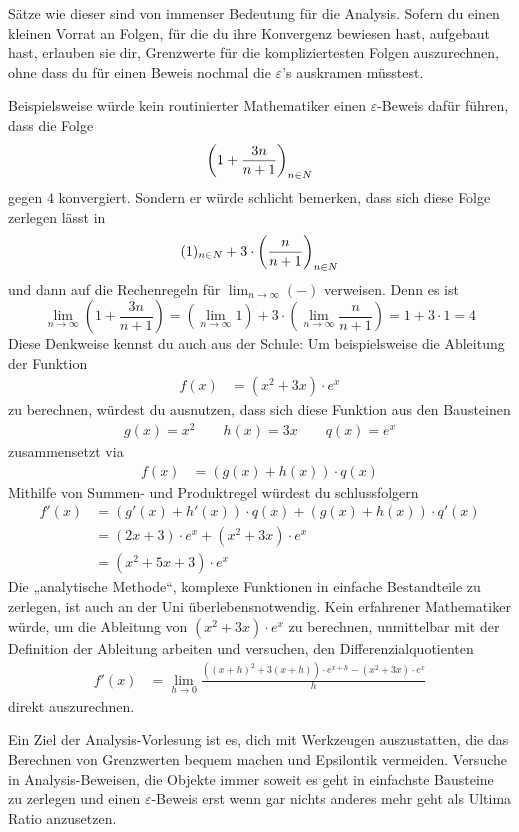 \begin{bem}
    Sätze wie dieser sind von immenser Bedeutung für die Analysis. Sofern du einen kleinen Vorrat an Folgen, für die du ihre Konvergenz bewiesen hast, aufgebaut hast, erlauben sie dir, Grenzwerte für die kompliziertesten Folgen auszurechnen, ohne dass du für einen Beweis nochmal die $\varepsilon$'s auskramen müsstest.
    
    Beispielsweise würde kein routinierter Mathematiker einen $\varepsilon$-Beweis dafür führen, dass die Folge
        \[ \left( 1 + \frac{3n}{n+1} \right)_{n\in \relax N} \]
    gegen $4$ konvergiert. Sondern er würde schlicht bemerken, dass sich diese Folge zerlegen lässt in
        \[ (1)_{n\in \relax N} + 3\cdot \left(\frac{n}{n+1}\right)_{n\in \relax N} \]
    und dann auf die Rechenregeln für $\lim_{n\to\infty}(-)$ verweisen. Denn es ist
        \[ \lim_{n\to \infty} \left( 1+ \frac{3n}{n+1} \right) = \left( \lim_{n\to \infty} 1 \right)+3\cdot \left( \lim_{n\to \infty} \frac{n}{n+1} \right) = 1+3\cdot 1 = 4 \]
    Diese Denkweise kennst du auch aus der Schule: Um beispielsweise die Ableitung der Funktion
    \begin{align*}
        f(x) &= (x^2+3x)\cdot e^x
    \end{align*}
    zu berechnen, würdest du ausnutzen, dass sich diese Funktion aus den Bausteinen
    \begin{align*}
        g(x) = x^2 \qquad h(x) = 3x \qquad q(x) = e^x
    \end{align*}
    zusammensetzt via
    \begin{align*}
        f(x) & = (g(x)+h(x))\cdot q(x)
    \end{align*}
    Mithilfe von Summen- und Produktregel würdest du schlussfolgern
    \begin{align*}
        f'(x) & = (g'(x)+h'(x))\cdot q(x)  + (g(x)+h(x))\cdot q'(x) \\
        & = (2x+3)\cdot e^x + (x^2+3x)\cdot e^x \\
        & = (x^2+5x+3)\cdot e^x
    \end{align*}
    Die „analytische Methode“, komplexe Funktionen in einfache Bestandteile zu zerlegen, ist auch an der Uni überlebensnotwendig. Kein erfahrener Mathematiker würde, um die Ableitung von $(x^2+3x)\cdot e^x$ zu berechnen, unmittelbar mit der Definition der Ableitung arbeiten und versuchen, den Differenzialquotienten
    \begin{align*}
        f'(x)&=\lim_{h\to 0} \frac{((x+h)^2+3(x+h))\cdot e^{x+h} - (x^2+3x)\cdot e^{x}}{h}
    \end{align*}
    direkt auszurechnen.

    Ein Ziel der Analysis-Vorlesung ist es, dich mit Werkzeugen auszustatten, die das Berechnen von Grenzwerten bequem machen und Epsilontik vermeiden. Versuche in Analysis-Beweisen, die Objekte immer soweit es geht in einfachste Bausteine zu zerlegen und einen $\varepsilon$-Beweis erst wenn gar nichts anderes mehr geht als Ultima Ratio anzusetzen.
\end{bem}



